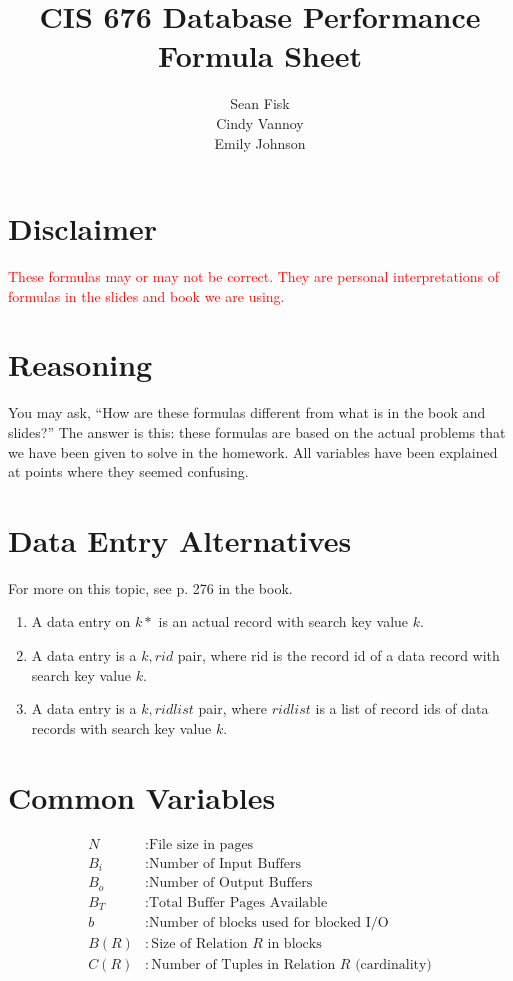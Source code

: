 \documentclass{article}
\title{CIS 676 Database Performance Formula Sheet}
\author{Sean Fisk \mailtohref{sean@seanfisk.com} \\
  Cindy Vannoy \\
  Emily Johnson}
\begin{document}
\maketitle

\section*{Disclaimer}

\textcolor{red}{These formulas may or may not be correct. They are personal
  interpretations of formulas in the slides and book we are using.}

\section*{Reasoning}

You may ask, ``How are these formulas different from what is in the
book and slides?'' The answer is this: these formulas are based on
the actual problems that we have been given to solve in the
homework. All variables have been explained at points where they
seemed confusing.

\section{Data Entry Alternatives}

For more on this topic, see p. 276 in the book.

\begin{enumerate}
\item A data entry on \(k*\) is an actual record with search key value
  \(k\).
\item A data entry is a \(k, \mathit{rid}\) pair, where rid is the
  record id of a data record with search key value \(k\).
\item A data entry is a \(k, \mathit{ridlist}\) pair, where
  \(\mathit{ridlist}\) is a list of record ids of data records with
  search key value \(k\).
\end{enumerate}

\section{Common Variables}

\begin{align*}
  N &: \text{File size in pages} \\
  B_i &: \text{Number of Input Buffers} \\
  B_o &: \text{Number of Output Buffers} \\
  B_T &: \text{Total Buffer Pages Available} \\
  b &: \text{Number of blocks used for blocked I/O} \\
  B(R) &: \text{Size of Relation \(R\) in blocks} \\
  C(R) &: \text{Number of Tuples in Relation \(R\) (cardinality)}
\end{align*}
\end{document}
